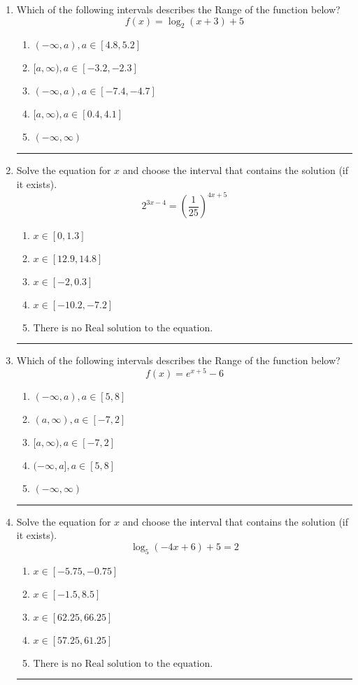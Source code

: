 \documentclass[14pt]{extbook}
\newcommand{\litem}[1]{\item#1\hspace*{-1cm}\rule{\textwidth}{0.4pt}}
\begin{document}
\begin{enumerate}
\litem{
Which of the following intervals describes the Range of the function below?\[ f(x) = \log_2{(x+3)}+5 \]\begin{enumerate}[label=\Alph*.]
\item \( (-\infty, a), a \in [4.8, 5.2] \)
\item \( [a, \infty), a \in [-3.2, -2.3] \)
\item \( (-\infty, a), a \in [-7.4, -4.7] \)
\item \( [a, \infty), a \in [0.4, 4.1] \)
\item \( (-\infty, \infty) \)

\end{enumerate} }
\litem{
Solve the equation for $x$ and choose the interval that contains the solution (if it exists).\[ 2^{3x-4} = \left(\frac{1}{25}\right)^{4x+5} \]\begin{enumerate}[label=\Alph*.]
\item \( x \in [0, 1.3] \)
\item \( x \in [12.9, 14.8] \)
\item \( x \in [-2, 0.3] \)
\item \( x \in [-10.2, -7.2] \)
\item \( \text{There is no Real solution to the equation.} \)

\end{enumerate} }
\litem{
Which of the following intervals describes the Range of the function below?\[ f(x) = e^{x+5}-6 \]\begin{enumerate}[label=\Alph*.]
\item \( (-\infty, a), a \in [5, 8] \)
\item \( (a, \infty), a \in [-7, 2] \)
\item \( [a, \infty), a \in [-7, 2] \)
\item \( (-\infty, a], a \in [5, 8] \)
\item \( (-\infty, \infty) \)

\end{enumerate} }
\litem{
Solve the equation for $x$ and choose the interval that contains the solution (if it exists).\[ \log_{5}{(-4x+6)}+5 = 2 \]\begin{enumerate}[label=\Alph*.]
\item \( x \in [-5.75, -0.75] \)
\item \( x \in [-1.5, 8.5] \)
\item \( x \in [62.25, 66.25] \)
\item \( x \in [57.25, 61.25] \)
\item \( \text{There is no Real solution to the equation.} \)


\end{enumerate}}
\end{enumerate}
\end{document}
